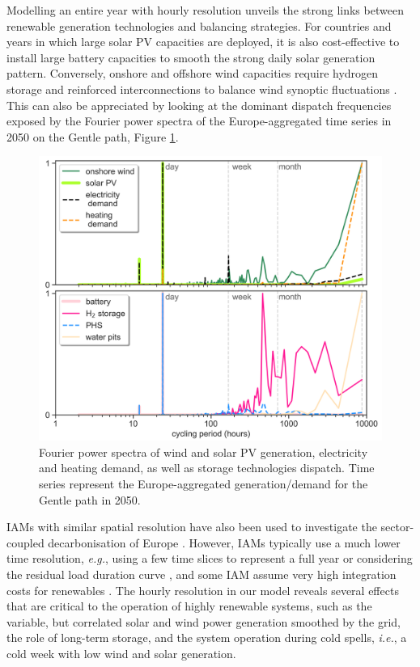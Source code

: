 \documentclass[5p]{elsarticle} %
\begin{document}
Modelling an entire year with hourly resolution unveils the strong links between renewable generation technologies and balancing strategies. For countries and years in which large solar PV capacities are deployed, it is also cost-effective to install large battery capacities to smooth the strong daily solar generation pattern. Conversely, onshore and offshore wind capacities require hydrogen storage and reinforced interconnections to balance wind synoptic fluctuations \cite{Rasmussen_2012, Schlachtberger_2017, Victoria_2019_storage}. %
This can also be appreciated by looking at the dominant dispatch frequencies exposed by the Fourier power spectra of the Europe-aggregated time series in 2050 on the Gentle path, Figure \ref{fig_Fourier}. \\

\begin{figure}[!h]
\centering
\includegraphics[width=\columnwidth]{../figures/Fourier.png}
\caption{Fourier power spectra of wind and solar PV generation, electricity and heating demand, as well as storage technologies dispatch. Time series represent the Europe-aggregated generation/demand for the Gentle path in 2050.} \label{fig_Fourier} 
\end{figure}

IAMs with similar spatial resolution have also been used to investigate the sector-coupled decarbonisation of Europe \cite{in-depth_2018, JRC-EU-TIMES, Creutzig_2017}. However, IAMs typically use a much lower time resolution, \textit{e.g.}, using a few time slices to represent a full year \cite{JRC-EU-TIMES, Loffler_2019, Poncelet_2016, McGlade_2015, Babrowski_2014} or considering the residual load duration curve \cite{Creutzig_2017, Ueckerdt_2017}, and some IAM assume very high integration costs for renewables \cite{Pietzcker_2014}. The hourly resolution in our model reveals several effects that are critical to the operation of highly renewable systems, such as the variable, but correlated solar and wind power generation smoothed by the grid, the role of long-term storage, and the system operation during cold spells, \textsl{i.e.}, a cold week with low wind and solar generation.
\end{document}
